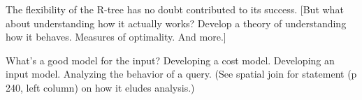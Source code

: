 The flexibility of the R-tree has no doubt contributed to its success.
[But what about understanding how it actually works?
Develop a theory of understanding how it behaves.
Measures of optimality.
And more.]

What's a good model for the input?
Developing a cost model.
Developing an input model.
Analyzing the behavior of a query. (See spatial join for statement (p 240, left column) on how it eludes analysis.)

